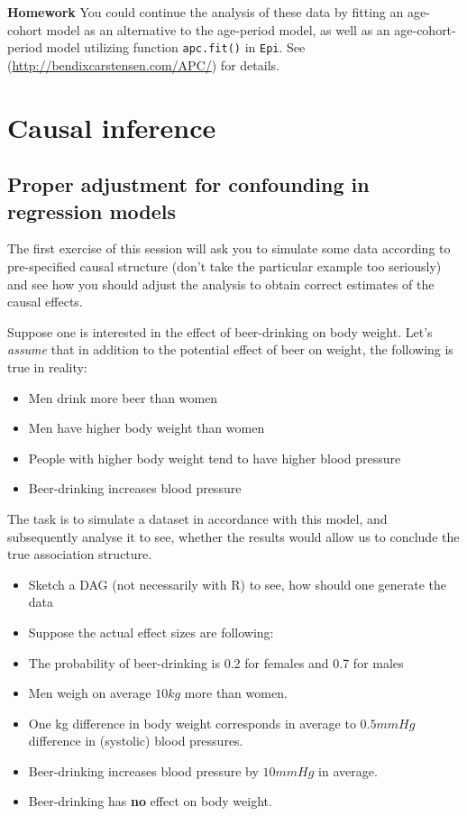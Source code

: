 \documentclass[
]{book}
\providecommand{\tightlist}{%
  \setlength{\itemsep}{0pt}\setlength{\parskip}{0pt}}
\begin{document}
\textbf{Homework} You could continue the analysis of these data by fitting an
age-cohort model as an alternative to the age-period model, as well as
an age-cohort-period model utilizing function \texttt{apc.fit()} in \texttt{Epi}. See
(\url{http://bendixcarstensen.com/APC/}) for details.

\chapter{Causal inference}\label{causal-inference}

\section{Proper adjustment for confounding in regression models}\label{proper-adjustment-for-confounding-in-regression-models}

The first exercise of this session will ask you to simulate some data according to pre-specified causal structure (don't take the particular example too seriously) and see how you should adjust the analysis to obtain correct estimates of the causal effects.

Suppose one is interested in the effect of beer-drinking on body weight. Let's \emph{assume} that in addition to the potential effect of beer on weight, the following is true in reality:

\begin{itemize}
\tightlist
\item
  Men drink more beer than women
\item
  Men have higher body weight than women
\item
  People with higher body weight tend to have higher blood pressure
\item
  Beer-drinking increases blood pressure
\end{itemize}

The task is to simulate a dataset in accordance with this model, and subsequently analyse it to see, whether the results would allow us to conclude the true association structure.

\begin{itemize}
\tightlist
\item
  Sketch a DAG (not necessarily with R) to see, how should one generate the data
\item
  Suppose the actual effect sizes are following:
\item
  The probability of beer-drinking is 0.2 for females and 0.7 for males
\item
  Men weigh on average \(10kg\) more than women.
\item
  One kg difference in body weight corresponds in average to \(0.5mmHg\) difference in (systolic) blood pressures.
\item
  Beer-drinking increases blood pressure by \(10mmHg\) in average.
\item
  Beer-drinking has \textbf{no} effect on body weight.
\end{itemize}
\end{document}
